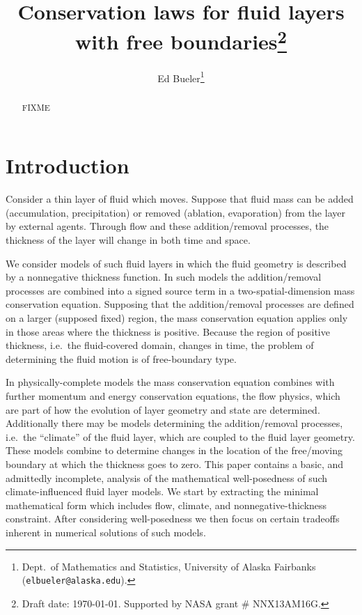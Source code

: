 \documentclass[final,onefignum]{siamart190516}
\title{Conservation laws for fluid layers with free boundaries\thanks{Draft date: \today.  Supported by NASA grant \# NNX13AM16G.}}
\author{Ed Bueler\thanks{Dept.~of Mathematics and Statistics, University of Alaska Fairbanks \,\, (\texttt{elbueler@alaska.edu}).}}
\begin{document}
\maketitle

\begin{abstract}
FIXME
\end{abstract}


\pagestyle{myheadings}
\thispagestyle{plain}


\section{Introduction}  \label{sec:intro}

Consider a thin layer of fluid which moves.  Suppose that fluid mass can be added (accumulation, precipitation) or removed (ablation, evaporation) from the layer by external agents.  Through flow and these addition/removal processes, the thickness of the layer will change in both time and space.

We consider models of such fluid layers in which the fluid geometry is described by a nonnegative thickness function.  In such models the addition/removal processes are combined into a signed source term in a two-spatial-dimension mass conservation equation.  Supposing that the addition/removal processes are defined on a larger (supposed fixed) region, the mass conservation equation applies only in those areas where the thickness is positive.  Because the region of positive thickness, i.e.~the fluid-covered domain, changes in time, the problem of determining the fluid motion is of free-boundary type.

In physically-complete models the mass conservation equation combines with further momentum and energy conservation equations, the flow physics, which are part of how the evolution of layer geometry and state are determined.  Additionally there may be models determining the addition/removal processes, i.e.~the ``climate'' of the fluid layer, which are coupled to the fluid layer geometry.  These models combine to determine changes in the location of the free/moving boundary at which the thickness goes to zero.  This paper contains a basic, and admittedly incomplete, analysis of the mathematical well-posedness of such climate-influenced fluid layer models.  We start by extracting the minimal mathematical form which includes flow, climate, and nonnegative-thickness constraint.  After considering well-posedness we then focus on certain tradeoffs inherent in numerical solutions of such models.
\end{document}
